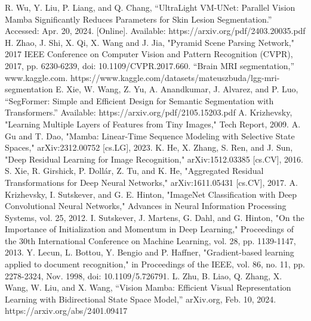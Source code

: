 \documentclass[conference]{IEEEtran}
\begin{document}
\begin{thebibliography}{00}
     R. Wu, Y. Liu, P. Liang, and Q. Chang, “UltraLight VM-UNet: Parallel Vision Mamba Significantly Reduces Parameters for Skin Lesion Segmentation.” Accessed: Apr. 20, 2024. [Online]. Available: https://arxiv.org/pdf/2403.20035.pdf
    H. Zhao, J. Shi, X. Qi, X. Wang and J. Jia, "Pyramid Scene Parsing Network," 2017 IEEE Conference on Computer Vision and Pattern Recognition (CVPR), 2017, pp. 6230-6239, doi: 10.1109/CVPR.2017.660.
     “Brain MRI segmentation,” www.kaggle.com. https://www.kaggle.com/datasets/mateuszbuda/lgg-mri-segmentation
     E. Xie, W. Wang, Z. Yu, A. Anandkumar, J. Alvarez, and P. Luo, “SegFormer: Simple and Efficient Design for Semantic Segmentation with Transformers.” Available: https://arxiv.org/pdf/2105.15203.pdf
     A. Krizhevsky, "Learning Multiple Layers of Features from Tiny Images," Tech Report, 2009.
     A. Gu and T. Dao, "Mamba: Linear-Time Sequence Modeling with Selective State Spaces," arXiv:2312.00752 [cs.LG], 2023.
     K. He, X. Zhang, S. Ren, and J. Sun, "Deep Residual Learning for Image Recognition," arXiv:1512.03385 [cs.CV], 2016.
     S. Xie, R. Girshick, P. Dollár, Z. Tu, and K. He, "Aggregated Residual Transformations for Deep Neural Networks," arXiv:1611.05431 [cs.CV], 2017.
     A. Krizhevsky, I. Sutskever, and G. E. Hinton, "ImageNet Classification with Deep Convolutional Neural Networks," Advances in Neural Information Processing Systems, vol. 25, 2012.
     I. Sutskever, J. Martens, G. Dahl, and G. Hinton, "On the Importance of Initialization and Momentum in Deep Learning," Proceedings of the 30th International Conference on Machine Learning, vol. 28, pp. 1139-1147, 2013.
     Y. Lecun, L. Bottou, Y. Bengio and P. Haffner, "Gradient-based learning applied to document recognition," in Proceedings of the IEEE, vol. 86, no. 11, pp. 2278-2324, Nov. 1998, doi: 10.1109/5.726791.
     L. Zhu, B. Liao, Q. Zhang, X. Wang, W. Liu, and X. Wang, “Vision Mamba: Efficient Visual Representation Learning with Bidirectional State Space Model,” arXiv.org, Feb. 10, 2024. https://arxiv.org/abs/2401.09417   
\end{thebibliography}
\end{document}
